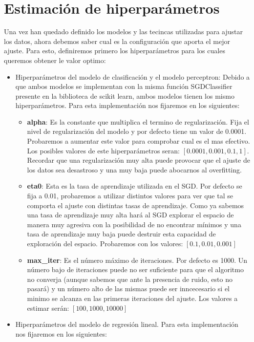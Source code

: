 \section{Estimación de hiperparámetros}
Una vez han quedado definido los modelos y las tecincas utilizadas para ajustar los datos, ahora debemos saber cual es la configuración que aporta el mejor ajuste. Para esto, definiremos primero los hiperparámetros para los cuales queremos obtener le valor optimo:
\begin{itemize}
   \item Hiperparámetros del modelo de clasificación y el modelo perceptron: Debido a que ambos modelos se implementan con la misma función SGDClassifier presente en la biblioteca de scikit learn, ambos modelos tienen los mismo hiperparámetros. Para esta implementación nos fijaremos en los siguientes\cite{SGDClassifier}:
   \begin{itemize}
      \item \textbf{alpha}: Es la constante que multiplica el termino de regularización. Fija el nivel de regularización del modelo y por defecto tiene un valor de 0.0001. Probaremos a aumentar este valor para comprobar cual es el mas efectivo. Los posibles valores de este hiperparámetros seran: $[0.0001, 0.001, 0.1, 1]$. Recordar que una regularización muy alta puede provocar que el ajuste de los datos sea desastroso y una muy baja puede abocarnos al overfitting.
      \item \textbf{eta0}: Esta es la tasa de aprendizaje utilizada en el SGD. Por defecto se fija a 0.01, probaremos a utilizar distintos valores para ver que tal se comporta el ajuste con distintas tasas de aprendizaje. Como ya sabemos una tasa de aprendizaje muy alta hará al SGD explorar el espacio de manera muy agresiva con la posibilidad de no encontrar mínimos y una tasa de aprendizaje muy baja puede destruir esta capacidad de exploración del espacio. Probaremos con los valores: $[0.1, 0.01, 0.001]$
      \item \textbf{max\_iter}: Es el número máximo de iteraciones. Por defecto es 1000. Un número bajo de iteraciones puede no ser suficiente para que el algoritmo no converja (aunque sabemos que ante la presencia de ruido, esto no pasará) y un número alto de las mismas puede ser inncecesario si el minimo se alcanza en las primeras iteraciones del ajuste. Los valores a estimar serán: $[100, 1000, 10000]$
   \end{itemize}
   \item Hiperparámetros del modelo de regresión lineal. Para esta implementación nos fijaremos en los siguientes\cite{logisticRegression}:

\end{itemize}
